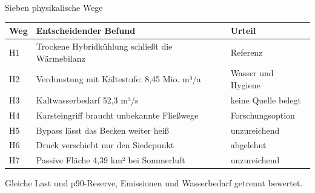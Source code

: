 \documentclass[aspectratio=169,17pt]{beamer}
\newcommand{\slidefoot}[1]{\vfill{\fontsize{10.5}{13}\selectfont\color{gray}#1\par}}
\begin{document}
\begin{frame}{Sieben physikalische Wege}
  \renewcommand{\arraystretch}{1.0}
  {\fontsize{11.5}{14}\selectfont
  \begin{tabular}{@{}>{\hspace{0pt}\raggedright\arraybackslash}p{11mm}>{\hspace{0pt}\raggedright\arraybackslash}p{79.5mm}>{\hspace{0pt}\raggedright\arraybackslash}p{45mm}@{}}
    \toprule
    Weg & Entscheidender Befund & Urteil \\
    \midrule
    \rowcolor{soft} H1 & Trockene Hybridkühlung schließt die Wärmebilanz & Referenz \\
    H2 & Verdunstung mit Kältestufe: 8,45 Mio. m³/a & Wasser und Hygiene \\
    H3 & Kaltwasserbedarf 52,3 m³/s & keine Quelle belegt \\
    H4 & Karsteingriff braucht unbekannte Fließwege & Forschungsoption \\
    H5 & Bypass lässt das Becken weiter heiß & unzureichend \\
    H6 & Druck verschiebt nur den Siedepunkt & abgelehnt \\
    H7 & Passive Fläche 4,39 km² bei Sommerluft & unzureichend \\
    \bottomrule
  \end{tabular}\par}
  \slidefoot{Gleiche Last und p90-Reserve, Emissionen und Wasserbedarf getrennt bewertet.}
\end{frame}
\end{document}
